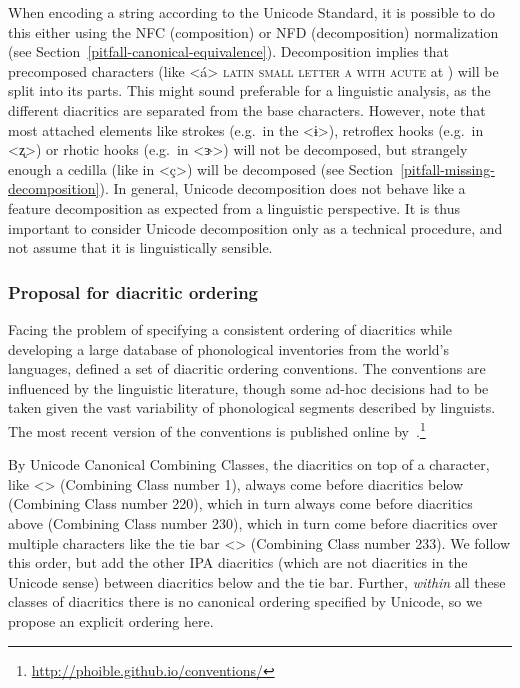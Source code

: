 
When encoding a string according to the Unicode Standard, it is possible to do
this either using the NFC (composition) or NFD (decomposition) normalization (see
Section~\ref{pitfall-canonical-equivalence}).
Decomposition implies that precomposed characters (like <á> \textsc{latin small
letter a with acute} at ) will be split into its parts. This might
sound preferable for a linguistic analysis, as the different diacritics are
separated from the base characters. However, note that most attached elements
like strokes (e.g.~in the <ɨ>), retroflex hooks (e.g.~in <ʐ>) or rhotic hooks
(e.g.~in <ɝ>) will not be decomposed, but strangely enough a cedilla (like in
<ç>) will be decomposed (see Section~\ref{pitfall-missing-decomposition}). In
general, Unicode decomposition does not behave like a feature decomposition as
expected from a linguistic perspective. It is thus important to consider Unicode
decomposition only as a technical procedure, and not assume that it is
linguistically sensible.

\subsubsection*{Proposal for diacritic ordering}

Facing the problem of specifying a consistent ordering of diacritics while
developing a large database of phonological inventories from the world's
languages, \citet[540]{Moran2012} defined a set of diacritic ordering
conventions. The conventions are influenced by the linguistic literature, though
some ad-hoc decisions had to be taken given the vast variability of phonological
segments described by linguists. The most recent version of the conventions 
is published online by~\citet{MoranMcCloy2014}.\footnote{\url{http://phoible.github.io/conventions/}}

By Unicode Canonical Combining Classes, the diacritics on top of a character,
like <> (Combining Class number 1), always come before diacritics
below (Combining Class number 220), which in turn always come before diacritics
above (Combining Class number 230), which in turn come before diacritics over
multiple characters like the tie bar <>
(Combining Class number 233). We follow this order, but add the other IPA
diacritics (which are not diacritics in the Unicode sense) between diacritics
below and the tie bar. Further, \textit{within} all these classes of diacritics
there is no canonical ordering specified by Unicode, so we propose an explicit
ordering here.

